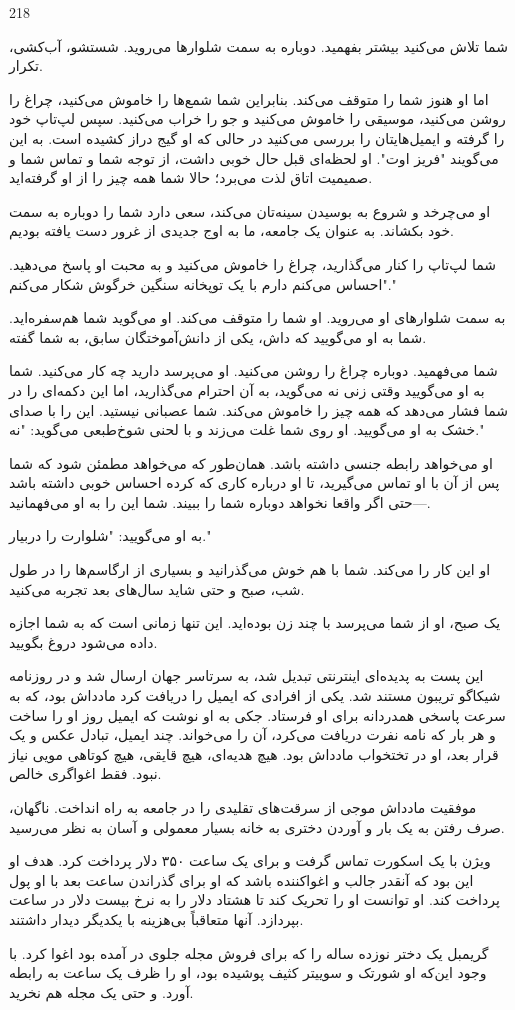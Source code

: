 218  
  
شما تلاش می‌کنید بیشتر بفهمید. دوباره به سمت شلوارها می‌روید. شستشو، آب‌کشی، تکرار.

اما او هنوز شما را متوقف می‌کند. بنابراین شما شمع‌ها را خاموش می‌کنید، چراغ را روشن می‌کنید، موسیقی را خاموش می‌کنید و جو را خراب می‌کنید. سپس لپ‌تاپ خود را گرفته و ایمیل‌هایتان را بررسی می‌کنید در حالی که او گیج دراز کشیده است. به این می‌گویند "فریز اوت". او لحظه‌ای قبل حال خوبی داشت، از توجه شما و تماس شما و صمیمیت اتاق لذت می‌برد؛ حالا شما همه چیز را از او گرفته‌اید.

او می‌چرخد و شروع به بوسیدن سینه‌تان می‌کند، سعی دارد شما را دوباره به سمت خود بکشاند. به عنوان یک جامعه، ما به اوج جدیدی از غرور دست یافته بودیم.

شما لپ‌تاپ را کنار می‌گذارید، چراغ را خاموش می‌کنید و به محبت او پاسخ می‌دهید. "احساس می‌کنم دارم با یک توپخانه سنگین خرگوش شکار می‌کنم."

به سمت شلوارهای او می‌روید. او شما را متوقف می‌کند. او می‌گوید شما هم‌سفره‌اید. شما به او می‌گویید که داش، یکی از دانش‌آموختگان سابق، به شما گفته.

شما می‌فهمید. دوباره چراغ را روشن می‌کنید. او می‌پرسد دارید چه کار می‌کنید. شما به او می‌گویید وقتی زنی نه می‌گوید، به آن احترام می‌گذارید، اما این دکمه‌ای را در شما فشار می‌دهد که همه چیز را خاموش می‌کند. شما عصبانی نیستید. این را با صدای خشک به او می‌گویید. او روی شما غلت می‌زند و با لحنی شوخ‌طبعی می‌گوید: "نه."

او می‌خواهد رابطه جنسی داشته باشد. همان‌طور که می‌خواهد مطمئن شود که شما پس از آن با او تماس می‌گیرید، تا او درباره کاری که کرده احساس خوبی داشته باشد—حتی اگر واقعا نخواهد دوباره شما را ببیند. شما این را به او می‌فهمانید.

به او می‌گویید: "شلوارت را دربیار."

او این کار را می‌کند. شما با هم خوش می‌گذرانید و بسیاری از ارگاسم‌ها را در طول شب، صبح و حتی شاید سال‌های بعد تجربه می‌کنید.

یک صبح، او از شما می‌پرسد با چند زن بوده‌اید. این تنها زمانی است که به شما اجازه داده می‌شود دروغ بگویید.

این پست به پدیده‌ای اینترنتی تبدیل شد، به سرتاسر جهان ارسال شد و در روزنامه شیکاگو تریبون مستند شد. یکی از افرادی که ایمیل را دریافت کرد مادداش بود، که به سرعت پاسخی همدردانه برای او فرستاد. جکی به او نوشت که ایمیل روز او را ساخت و هر بار که نامه نفرت دریافت می‌کرد، آن را می‌خواند. چند ایمیل، تبادل عکس و یک قرار بعد، او در تختخواب مادداش بود. هیچ هدیه‌ای، هیچ قایقی، هیچ کوتاهی مویی نیاز نبود. فقط اغواگری خالص.

موفقیت مادداش موجی از سرقت‌های تقلیدی را در جامعه به راه انداخت. ناگهان، صرف رفتن به یک بار و آوردن دختری به خانه بسیار معمولی و آسان به نظر می‌رسید.

ویژن با یک اسکورت تماس گرفت و برای یک ساعت ۳۵۰ دلار پرداخت کرد. هدف او این بود که آنقدر جالب و اغواکننده باشد که او برای گذراندن ساعت بعد با او پول پرداخت کند. او توانست او را تحریک کند تا هشتاد دلار را به نرخ بیست دلار در ساعت بپردازد. آنها متعاقباً بی‌هزینه با یکدیگر دیدار داشتند.

گریمبل یک دختر نوزده ساله را که برای فروش مجله جلوی در آمده بود اغوا کرد. با وجود این‌که او شورتک و سوییتر کثیف پوشیده بود، او را ظرف یک ساعت به رابطه آورد. و حتی یک مجله هم نخرید.